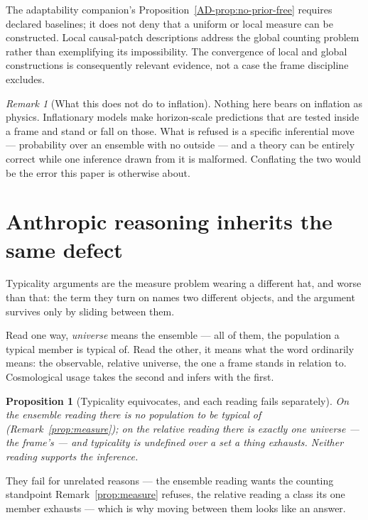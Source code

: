 \documentclass[11pt,a4paper]{article}
\newtheorem{proposition}[definition]{Proposition}
\theoremstyle{remark}\newtheorem{remark}[definition]{Remark}
\begin{document}
The adaptability companion's Proposition~\ref{AD-prop:no-prior-free}
requires declared baselines; it does not deny that a uniform or local measure
can be constructed. Local causal-patch descriptions address the global
counting problem rather than exemplifying its impossibility. The convergence
of local and global constructions is consequently relevant evidence, not a
case the frame discipline excludes.

\begin{remark}[What this does not do to inflation]\label{rem:inflation}
Nothing here bears on inflation as physics. Inflationary models make horizon-scale predictions
that are tested inside a frame and stand or fall on those. What is refused is a specific inferential
move --- probability over an ensemble with no outside --- and a theory can be entirely correct while one
inference drawn from it is malformed. Conflating the two would be the error this paper is
otherwise about.
\end{remark}

\section{Anthropic reasoning inherits the same defect}\label{sec:anthropic}
Typicality arguments are the measure problem wearing a different hat, and worse than that: the
term they turn on names two different objects, and the argument survives only by sliding between them.

Read one way, \emph{universe} means the ensemble --- all of them, the population a typical
member is typical of. Read the other, it means what the word ordinarily means: the observable,
relative universe, the one a frame stands in relation to. Cosmological usage takes the second and infers
with the first.

\begin{proposition}[Typicality equivocates, and each reading fails separately]\label{prop:typical}
On the ensemble reading there is no population to be typical of (Remark~\ref{prop:measure}); on
the relative reading there is exactly one universe --- the frame's --- and \emph{typicality is
undefined over a set a thing exhausts}. \emph{Neither reading supports the inference.}
\end{proposition}

They fail for unrelated reasons --- the ensemble reading wants the counting standpoint
Remark~\ref{prop:measure} refuses, the relative reading a class its one member exhausts --- which
is why moving between them looks like an answer.
\end{document}
